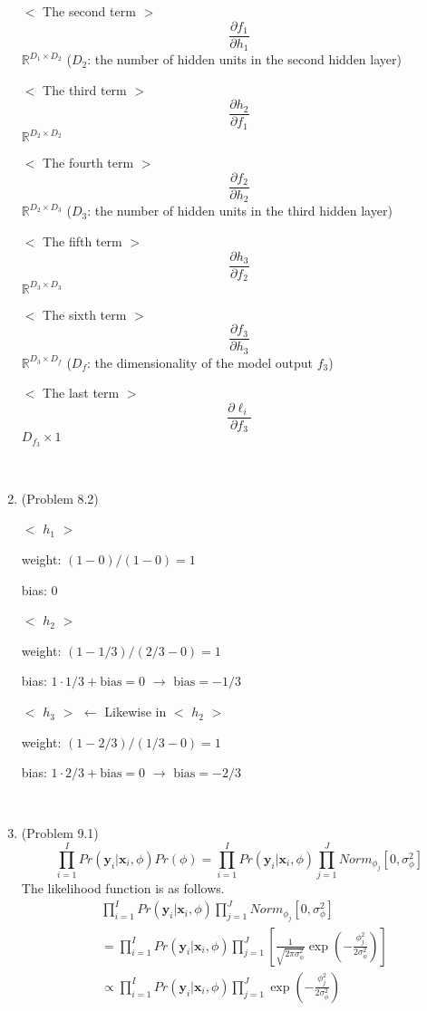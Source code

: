 \documentclass[10pt]{article}
\begin{document}
\begin{enumerate}
	$<$ The second term $>$
	$$\frac{\partial f_1}{\partial h_1}$$
	$\mathbb{R}^{D_1 \times D_2}$ ($D_2$: the number of hidden units in the second hidden layer)
	
	$<$ The third term $>$
	$$\frac{\partial h_2}{\partial f_1}$$
	$\mathbb{R}^{D_2 \times D_2}$
	
	$<$ The fourth term $>$
	$$\frac{\partial f_2}{\partial h_2}$$
	$\mathbb{R}^{D_2 \times D_3}$ ($D_3$: the number of hidden units in the third hidden layer)
	
	$<$ The fifth term $>$
	$$\frac{\partial h_3}{\partial f_2}$$
	$\mathbb{R}^{D_3 \times D_3}$
	
	$<$ The sixth term $>$
	$$\frac{\partial f_3}{\partial h_3}$$
	$\mathbb{R}^{D_3 \times D_f}$ ($D_f$: the dimensionality of the model output $f_3$)
	
	$<$ The last term $>$
	$$\frac{\partial \ell_i}{\partial f_3}$$
	$D_{f_3} \times 1$

\
	
\item (Problem 8.2)

	$<$ $h_1$ $>$
	
	weight: $(1-0)/(1-0)=1$
	
	bias: 0	
	
	$<$ $h_2$ $>$
	
	weight: $(1-1/3)/(2/3-0)=1$

	bias: $1\cdot 1/3+\text{bias}=0$ $\rightarrow$ $\text{bias}=-1/3$
	
	$<$ $h_3$ $>$ $\leftarrow$ Likewise in $<$ $h_2$ $>$
	
	weight: $(1-2/3)/(1/3-0)=1$

	bias: $1\cdot 2/3+\text{bias}=0$ $\rightarrow$ $\text{bias}=-2/3$

\

\item (Problem 9.1)
	$$\prod_{i=1}^I Pr(\mathbf{y}_i|\mathbf{x}_i, \phi)Pr(\phi)=\prod_{i=1}^I Pr(\mathbf{y}_i|\mathbf{x}_i, \phi)\prod_{j=1}^J Norm_{\phi_j}[0, \sigma_{\phi}^2]$$
	The likelihood function is as follows.
	\begin{align*}
	& \prod_{i=1}^I Pr(\mathbf{y}_i|\mathbf{x}_i, \phi) \prod_{j=1}^J Norm_{\phi_j}[0, \sigma_{\phi}^2] \\
	&= \prod_{i=1}^I Pr(\mathbf{y}_i|\mathbf{x}_i, \phi) \prod_{j=1}^J [\frac{1}{\sqrt{2 \pi \sigma_{\phi}^2}}\exp(-\frac{\phi_j^2}{2\sigma_{\phi}^2})] \\
	&\propto \prod_{i=1}^I Pr(\mathbf{y}_i|\mathbf{x}_i, \phi) \prod_{j=1}^J \exp(-\frac{\phi_j^2}{2\sigma_{\phi}^2})
	\end{align*}
	

\end{enumerate}
\end{document}
